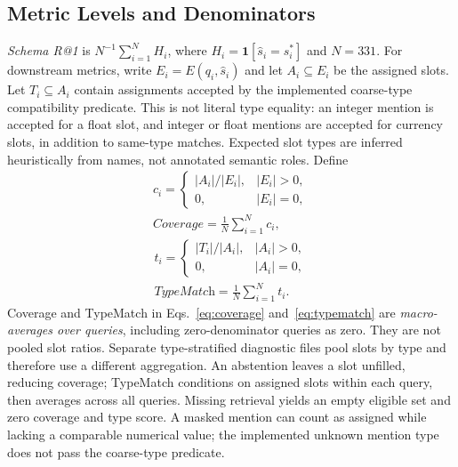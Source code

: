 \documentclass[pdflatex,iicol,sn-basic,Numbered]{sn-jnl}
\begin{document}
\subsection{Metric Levels and Denominators}
\textit{Schema R@1} is $N^{-1}\sum_{i=1}^N H_i$, where $H_i=\mathbf{1}[\hat{s}_i=s_i^*]$ and $N=331$. For downstream metrics, write $E_i=E(q_i,\hat{s}_i)$ and let $A_i\subseteq E_i$ be the assigned slots. Let $T_i\subseteq A_i$ contain assignments accepted by the implemented coarse-type compatibility predicate. This is not literal type equality: an integer mention is accepted for a float slot, and integer or float mentions are accepted for currency slots, in addition to same-type matches. Expected slot types are inferred heuristically from names, not annotated semantic roles. Define
\begin{equation}
\begin{gathered}
c_i=\begin{cases}|A_i|/|E_i|,& |E_i|>0,\\0,& |E_i|=0,\end{cases}
\\[3pt]
\textit{Coverage}=\frac{1}{N}\sum_{i=1}^N c_i,
\end{gathered}
\label{eq:coverage}
\end{equation}
\begin{equation}
\begin{gathered}
t_i=\begin{cases}|T_i|/|A_i|,& |A_i|>0,\\0,& |A_i|=0,\end{cases}
\\[3pt]
\textit{TypeMatch}=\frac{1}{N}\sum_{i=1}^N t_i.
\end{gathered}
\label{eq:typematch}
\end{equation}
Coverage and TypeMatch in Eqs.~\eqref{eq:coverage} and~\eqref{eq:typematch} are \emph{macro-averages over queries}, including zero-denominator queries as zero. They are not pooled slot ratios. Separate type-stratified diagnostic files pool slots by type and therefore use a different aggregation. An abstention leaves a slot unfilled, reducing coverage; TypeMatch conditions on assigned slots within each query, then averages across all queries. Missing retrieval yields an empty eligible set and zero coverage and type score. A masked mention can count as assigned while lacking a comparable numerical value; the implemented unknown mention type does not pass the coarse-type predicate.
\end{document}
